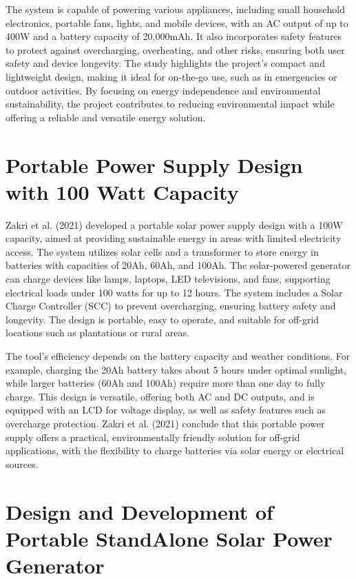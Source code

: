 {The system is capable of powering various appliances, including small household electronics, portable fans, lights, and mobile devices, with an AC output of up to 400W and a battery capacity of 20,000mAh. It also incorporates safety features to protect against overcharging, overheating, and other risks, ensuring both user safety and device longevity. The study highlights the project’s compact and lightweight design, making it ideal for on-the-go use, such as in emergencies or outdoor activities. By focusing on energy independence and environmental sustainability, the project contributes to reducing environmental impact while offering a reliable and versatile energy solution.

\section{Portable Power Supply Design with 100 Watt Capacity}

Zakri et al. (2021) developed a portable solar power supply design with a 100W capacity, aimed at providing sustainable energy in areas with limited electricity access. The system utilizes solar cells and a transformer to store energy in batteries with capacities of 20Ah, 60Ah, and 100Ah. The solar-powered generator can charge devices like lamps, laptops, LED televisions, and fans, supporting electrical loads under 100 watts for up to 12 hours. The system includes a Solar Charge Controller (SCC) to prevent overcharging, ensuring battery safety and longevity. The design is portable, easy to operate, and suitable for off-grid locations such as plantations or rural areas.

The tool's efficiency depends on the battery capacity and weather conditions. For example, charging the 20Ah battery takes about 5 hours under optimal sunlight, while larger batteries (60Ah and 100Ah) require more than one day to fully charge. This design is versatile, offering both AC and DC outputs, and is equipped with an LCD for voltage display, as well as safety features such as overcharge protection. Zakri et al. (2021) conclude that this portable power supply offers a practical, environmentally friendly solution for off-grid applications, with the flexibility to charge batteries via solar energy or electrical sources.

\section{Design and Development of Portable StandAlone Solar Power Generator }

}
